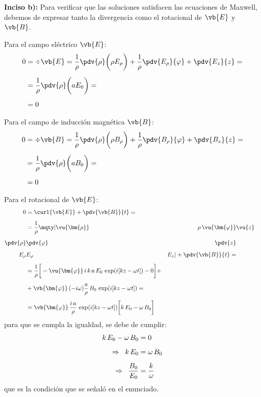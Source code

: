 \noindent
\textbf{Inciso b):} Para verificar que las soluciones satisfacen las ecuaciones de Maxwell, debemos de expresar tanto la divergencia como el rotacional de $\vb{E}$ y $\vb{B}$.

\noindent
Para el campo eléctrico $\vb{E}$:
\begin{align*}
0 &= \div{\vb{E}} = \dfrac{1}{\rho} \pdv{\rho} \bigg( \rho E_{\rho} \bigg) + \dfrac{1}{\rho} \pdv{E_{\rho}}{\varphi} + \pdv{E_{z}}{z} = \\[0.5em]
&= \dfrac{1}{\rho} \pdv{\rho} \bigg( a E_{0} \bigg) = \\[0.5em]
&= 0
\end{align*}

\noindent
Para el campo de inducción magnética $\vb{B}$:
\begin{align*}
0 &= \div{\vb{B}} = \dfrac{1}{\rho} \pdv{\rho} \bigg( \rho B_{\rho} \bigg) + \dfrac{1}{\rho} \pdv{B_{\rho}}{\varphi} + \pdv{B_{z}}{z} = \\[0.5em]
&= \dfrac{1}{\rho} \pdv{\rho} \bigg( a B_{0}\bigg) = \\[0.5em]
&= 0
\end{align*}

\noindent
Para el rotacional de $\vb{E}$:
\begin{align*}
0 &= \curl{\vb{E}} + \pdv{\vb{B}}{t} = \\[0.5em]
&= \dfrac{1}{\rho} \mqty|
\vu{\bm{\rho}} & \rho \, \vu{\bm{\varphi}} & \vu{z} \\[0.5em]
\displaystyle \pdv{\rho} & \displaystyle  \pdv{\varphi} & \displaystyle \pdv{z} \\[0.5em]
E_{\rho} & E_{\varphi} & E_{z} | + \pdv{\vb{B}}{t} = \\[0.5em]
&= \dfrac{1}{\rho} \bigg[ - \vu{\bm{\varphi}} \, i \, k \, a \, E_{0} \, \exp(i [k z - \omega t]) - 0 \bigg] + \\[0.5em]
&+ \vb{\bm{\varphi}} \, (- i \omega) \dfrac{a}{\rho} \, B_{0} \, \exp(i [k z - \omega t]) = \\[0.5em]
&= \vb{\bm{\varphi}} \, \dfrac{i \, a}{\rho} \, \exp(i [k z - \omega t]) \bigg[ k \, E_{0} - \omega \, B_{0} \bigg]
\end{align*}
para que se cumpla la igualdad, se debe de cumplir:
\begin{align*}
k \, E_{0} - \omega \, B_{0} &= 0 \\[0.5em]
\Rightarrow \hspace{0.2cm} k \, E_{0} &= \omega \, B_{0} \\[0.5em]
\Rightarrow \hspace{0.2cm} \dfrac{B_{0}}{E_{0}} &= \dfrac{k}{\omega}
\end{align*}
que es la condición que se señaló en el enunciado.

